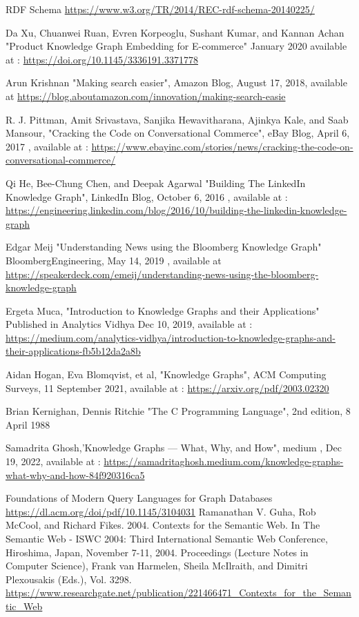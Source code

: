 \documentclass[conference]{IEEEtran}
\begin{document}
\begin{thebibliography}{00}

 RDF Schema \url{https://www.w3.org/TR/2014/REC-rdf-schema-20140225/}

 Da Xu, Chuanwei Ruan, Evren Korpeoglu, Sushant Kumar, and Kannan Achan "Product Knowledge Graph Embedding for E-commerce"  January 2020 available at : \url{https://doi.org/10.1145/3336191.3371778}

 Arun Krishnan "Making search easier", Amazon Blog, August 17, 2018, available at \url{https://blog.aboutamazon.com/innovation/making-search-easie}

 R. J. Pittman, Amit Srivastava, Sanjika Hewavitharana, Ajinkya Kale, and Saab Mansour, "Cracking the Code on Conversational Commerce", eBay Blog,  April 6, 2017 , available at :  \url{https://www.ebayinc.com/stories/news/cracking-the-code-on-conversational-commerce/}

Qi He, Bee-Chung Chen, and Deepak Agarwal "Building The
LinkedIn Knowledge Graph", LinkedIn Blog,  October 6, 2016 , available at : \url{https://engineering.linkedin.com/blog/2016/10/building-the-linkedin-knowledge-graph}

 Edgar Meij "Understanding News using the Bloomberg Knowledge
Graph" BloombergEngineering, May 14, 2019 , available at 
\url{https://speakerdeck.com/emeij/understanding-news-using-the-bloomberg-knowledge-graph}

 Ergeta Muca, "Introduction to Knowledge Graphs and their Applications" Published in
Analytics Vidhya Dec 10, 2019, available 
at : \url{https://medium.com/analytics-vidhya/introduction-to-knowledge-graphs-and-their-applications-fb5b12da2a8b}

 Aidan Hogan, Eva Blomqvist, et al, "Knowledge Graphs", ACM
Computing Surveys, 11 September 2021,  available at : \url{https://arxiv.org/pdf/2003.02320}

 Brian Kernighan, Dennis Ritchie "The C Programming Language", 2nd edition, 8 April 1988

 Samadrita Ghosh,'Knowledge Graphs — What, Why, and How", medium , Dec 19, 2022, available at : \url{https://samadritaghosh.medium.com/knowledge-graphs-what-why-and-how-84f920316ca5}

 Foundations of Modern Query Languages for Graph
Databases \url{https://dl.acm.org/doi/pdf/10.1145/3104031}
 Ramanathan V. Guha, Rob McCool, and Richard Fikes. 2004. Contexts for the Semantic Web. In The Semantic Web -
ISWC 2004: Third International Semantic Web Conference, Hiroshima, Japan, November 7-11, 2004. Proceedings (Lecture
Notes in Computer Science), Frank van Harmelen, Sheila McIlraith, and Dimitri Plexousakis (Eds.), Vol. 3298. \url{https://www.researchgate.net/publication/221466471_Contexts_for_the_Semantic_Web}


\end{thebibliography}
\end{document}
